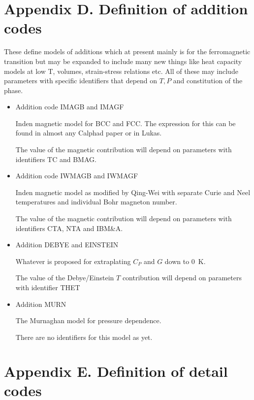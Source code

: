 \documentclass[12pt]{article}
\begin{document}
\newpage

\section{Appendix D.  Definition of addition codes}

These define models of additions which at present mainly is for the
ferromagnetic transition but may be expanded to include many new
things like heat capacity models at low T, volumes, strain-stress
relations etc.  All of these may include parameters with specific
identifiers that depend on $T, P$ and constitution of the phase.

\begin{itemize}
\item Addition code IMAGB and IMAGF

  Inden magnetic model for BCC and FCC.  The expression for this can
  be found in almost any Calphad paper or in Lukas\cite{07Luk}.

  The value of the magnetic contribution will depend on parameters
  with identifiers TC and BMAG.

\item Addition code IWMAGB and IWMAGF

  Inden magnetic model as modified by Qing-Wei with separate Curie and
  Neel temperatures and individual Bohr magneton number.\cite{13Wei}

  The value of the magnetic contribution will depend on parameters
  with identifiers CTA, NTA and IBM\&A.

\item Addition DEBYE and EINSTEIN

  Whatever is proposed for extraplating $C_P$ and $G$ down to 0~K.

  The value of the Debye/Einstein $T$ contribution will depend on parameters
  with identifier THET

\item Addition MURN

  The Murnaghan model for pressure dependence.

  There are no identifiers for this model as yet.

\end{itemize}

\newpage

\section{Appendix E.  Definition of detail codes}
\end{document}
